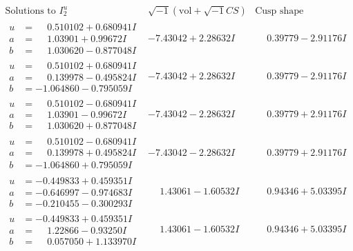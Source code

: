 \documentclass[1p]{elsarticle_modified}
\theoremstyle{definition}
\newcommand{\I}{\sqrt{-1}}
\begin{document}
$$\begin{array}{c|c|c}  
\text{Solutions to }I^u_{2}& \I (\text{vol} + \sqrt{-1}CS) & \text{Cusp shape}\\
 \hline 
\begin{aligned}
u &= \phantom{-}0.510102 + 0.680941 I \\
a &= \phantom{-}1.03901 + 0.99672 I \\
b &= \phantom{-}1.030620 - 0.877048 I\end{aligned}
 & -7.43042 + 2.28632 I & \phantom{-}0.39779 - 2.91176 I \\ \hline\begin{aligned}
u &= \phantom{-}0.510102 + 0.680941 I \\
a &= \phantom{-}0.139978 - 0.495824 I \\
b &= -1.064860 - 0.795059 I\end{aligned}
 & -7.43042 + 2.28632 I & \phantom{-}0.39779 - 2.91176 I \\ \hline\begin{aligned}
u &= \phantom{-}0.510102 - 0.680941 I \\
a &= \phantom{-}1.03901 - 0.99672 I \\
b &= \phantom{-}1.030620 + 0.877048 I\end{aligned}
 & -7.43042 - 2.28632 I & \phantom{-}0.39779 + 2.91176 I \\ \hline\begin{aligned}
u &= \phantom{-}0.510102 - 0.680941 I \\
a &= \phantom{-}0.139978 + 0.495824 I \\
b &= -1.064860 + 0.795059 I\end{aligned}
 & -7.43042 - 2.28632 I & \phantom{-}0.39779 + 2.91176 I \\ \hline\begin{aligned}
u &= -0.449833 + 0.459351 I \\
a &= -0.646997 - 0.974683 I \\
b &= -0.210455 - 0.300293 I\end{aligned}
 & \phantom{-}1.43061 - 1.60532 I & \phantom{-}0.94346 + 5.03395 I \\ \hline\begin{aligned}
u &= -0.449833 + 0.459351 I \\
a &= \phantom{-}1.22866 - 0.93250 I \\
b &= \phantom{-}0.057050 + 1.133970 I\end{aligned}
 & \phantom{-}1.43061 - 1.60532 I & \phantom{-}0.94346 + 5.03395 I \\ \hline\begin{aligned}

\end{aligned}
\end{array}$$
\end{document}

